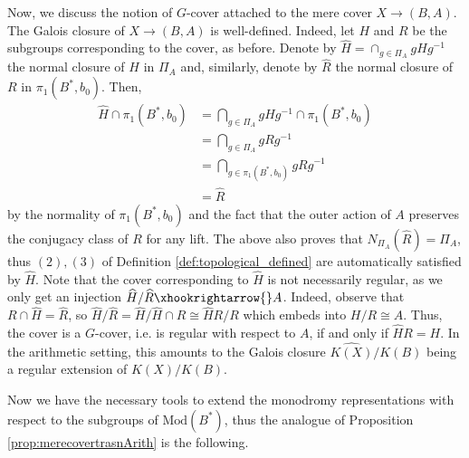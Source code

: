 \documentclass[10pt]{amsart}
\theoremstyle{definition}
\begin{document}
Now, we discuss the notion of $G$-cover attached to the mere cover $X\rightarrow (B,A)$. The Galois closure of $X\rightarrow (B,A)$ is well-defined. Indeed, let $H$ and $R$ be the subgroups corresponding to the cover, as before. Denote by $\widehat{H} = \cap_{g \in \Pi_A} gHg^{-1}$ the normal closure of $H$ in $\Pi_A$ and, similarly, denote by $\widehat{R}$ the normal closure of $R$ in $\pi_1(B^*,b_0)$. Then,
\begin{align*}
\widehat{H}\cap \pi_1(B^*,b_0) &= \bigcap\limits_{g \in \Pi_A} g Hg^{-1} \cap \pi_1(B^*,b_0) \\
& = \bigcap\limits_{g\in \Pi_A } g R g^{-1} \\
& = \bigcap\limits_{g \in \pi_1(B^*,b_0)} gRg^{-1} \\ 
&= \widehat{R}
\end{align*} by the normality of $\pi_1(B^*,b_0)$ and the fact that the outer action of $A$ preserves the conjugacy class of $R$ for any lift. The above also proves that $N_{\Pi_A}(\widehat{R}) = \Pi_A$, thus $(2),(3)$ of Definition \ref{def:topological_defined} are automatically satisfied by $\widehat{H}$. Note that the cover corresponding to $\widehat{H}$ is not necessarily regular, as we only get an injection $\widehat{H}/\widehat{R} \xhookrightarrow{} A$. Indeed, observe that $R\cap \widehat{H} = \widehat{R}$, so $\widehat{H}/\widehat{R} = \widehat{H}/\widehat{H}\cap R \cong \widehat{H}R/R$ which embeds into $H/R \cong A$. Thus, the cover is a $G$-cover, i.e. is regular with respect to $A$, if and only if $\widehat{H}R = H$. In the arithmetic setting, this amounts to the Galois closure $\widehat{K(X)}/K(B)$ being a regular extension of $K(X)/K(B)$.


Now we have the necessary tools to extend the monodromy representations with respect to the subgroups of $\mathrm{Mod}(B^*)$, thus the analogue of Proposition \ref{prop:merecovertrasnArith} is the following.
\end{document}
